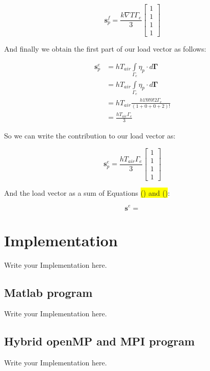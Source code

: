 \documentclass[12pt]{article}
\newcommand{\hilight}[1]{\colorbox{yellow}{#1}}
\begin{document}
\begin{equation}
\mathbf{s}_p^f = \frac{k\nabla T\Gamma_e}{3}
\begin{bmatrix} 1 \\ 1 \\ 1 \\ 1 
\end{bmatrix}
\end{equation}

And finally we obtain the first part of our load vector as follows:

\begin{align*}
 \mathbf{s}_p^e &= hT_{air} \int\limits_{\Gamma_{e}}{\eta_p} \cdot d \mathbf{\Gamma} \\
 &= hT_{air} \int\limits_{\Gamma_{e}}{\eta_p} \cdot d \mathbf{\Gamma} \\
 &= hT_{air} \frac{h 1!0!0!2\Gamma_e}{(1+0+0+2)!} \\
 &= \frac{hT_{air}\Gamma_e}{3}
\end{align*}

So we can write the contribution to our load vector as:

\begin{equation}
\mathbf{s}_p^e = \frac{hT_{air}\Gamma_e}{3}
\begin{bmatrix} 1 \\ 1 \\ 1 \\ 1 
\end{bmatrix}
\end{equation}

And the load vector as a sum of Equations \hilight{() and ()}:

\begin{equation}
\mathbf{s}^e = 
\end{equation}

	\section{Implementation}
	Write your Implementation here.

	\subsection{Matlab program}
	Write your Implementation here.
	
	\subsection{Hybrid openMP and MPI program}
	Write your Implementation here.
	
\end{document}
